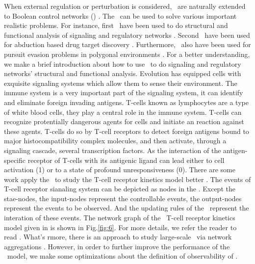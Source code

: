 When external regulation or perturbation is considered, \BNs\ are naturally extended to Boolean control networks (\BCNs) \cite{Ideker2001A}. The \BCNs\ can be used to solve various important realistic problems. For instance, first \BCNs\ have been used to do structural and functional analysis of  signaling and regulatory networks \cite{Kaufman1999A, Klamt2006A}. Second \BCNs\ have been used for abduction based drug target discovery \cite{Biane2017Abduction}. Furthermore, \BCNs\ also have been used for pursuit evasion problems in polygonal environments \cite{Thunberg2011A}. For a better understanding, we make a brief introduction about how to use \BCNs\ to do signaling and regulatory networks' structural and functional analysis. Evolution has equipped cells with exquisite signaling systems which allow them to sense their environment. The immune system is a very important part of the signaling system, it can identify and eliminate foreign invading antigens. T-cells known as lymphocytes are a type of white blood cells, they play a central role in the immune system. T-cells can recognize protentially dangerous agents for cells and initiate an reaction against these agents. T-cells do so by T-cell receptors to detect foreign antigens bound to major histocompatibility complex molecules, and then activate, through a signaling cascade, several transcription factors. As the interaction of the antigen-specific receptor of T-cells with its antigenic ligand can lead either to cell activation (1) or to a state of profound unresponsiveness (0). There are some work  apply the \BCNs\ to study the T-cell receptor kinetics model better \cite{Kaufman1999A, Klamt2006A}. The events of T-cell receptor sianaling system can be depicted as nodes in the \BCN. Except the stae-nodes, the input-nodes represent the controllable events, the output-nodes represent the events to be observed. And the updating rules of the \BCN\ represent the interation of these events. The network graph of the \BCN\ T-cell receptor kinetics model given in \cite{Klamt2006A} is shown in Fig.\ref{fig:6}. For more details, we refer the reader to read \cite{Klamt2006A}. What's rmore, there is an approach to study large-scale \BCNs\ via network aggregations \cite{Zhang2017Observability}. However, in order to further improve the performance of the \BCN\ model, we make some optimizations about the definition of observability of \BCNs.
